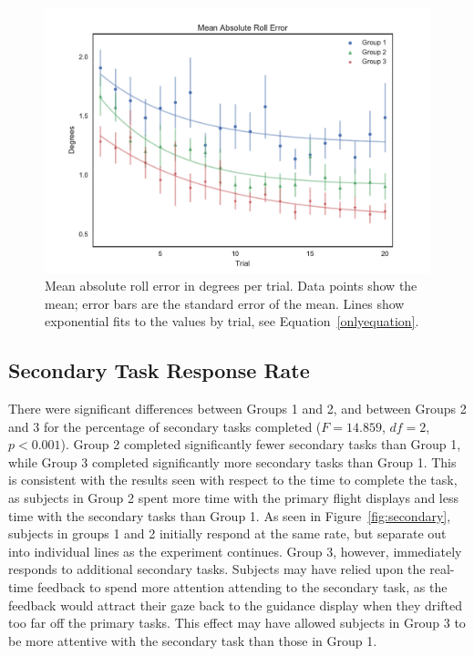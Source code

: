 \documentclass[]{aiaa-tc}%
\begin{document}
\begin{figure}[tb!]
  \centering
  \includegraphics[width=0.825\linewidth]{figs/Group_absRollErr_clean_fit_30.pdf}
  \caption[Mean absolute roll error in degrees per trial]{Mean absolute roll error in degrees per trial. Data points show the mean; error bars are the standard error of the mean. Lines show exponential fits to the values by trial, see Equation~\ref{onlyequation}.}
  \label{fig:roll}
\end{figure}


\subsection{Secondary Task Response Rate}
There were significant differences between Groups 1 and 2, and between Groups 2 and 3 for the percentage of secondary tasks completed ($F=14.859$, $df = 2$, $p < 0.001$).%
Group 2 completed significantly fewer secondary tasks than Group 1, while Group 3 completed significantly more secondary tasks than Group 1. This is consistent with the results seen with respect to the time to complete the task, as subjects in Group 2 spent more time with the primary flight displays and less time with the secondary tasks than Group 1. As seen in Figure~\ref{fig:secondary}, subjects in groups 1 and 2 initially respond at the same rate, but separate out into individual lines as the experiment continues. Group 3, however, immediately responds to additional secondary tasks. Subjects may have relied upon the real-time feedback to spend more attention attending to the secondary task, as the feedback would attract their gaze back to the guidance display when they drifted too far off the primary tasks. This effect may have allowed subjects in Group 3 to be more attentive with the secondary task than those in Group 1.
\end{document}

